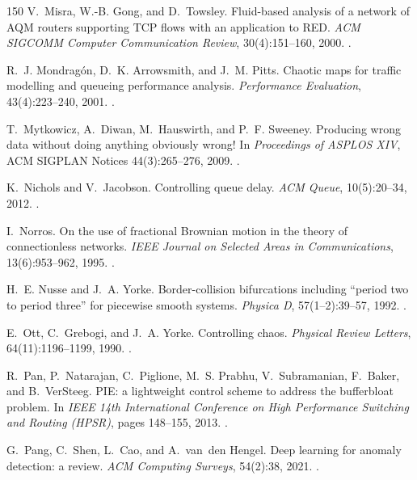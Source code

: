 \begin{thebibliography}{150}
V.~Misra, W.-B. Gong, and D.~Towsley. Fluid-based analysis of a network of AQM routers supporting TCP flows with an application to RED. \emph{ACM SIGCOMM Computer Communication Review}, 30(4):151--160, 2000. .

R.~J. Mondrag{\'o}n, D.~K. Arrowsmith, and J.~M. Pitts. Chaotic maps for traffic modelling and queueing performance analysis. \emph{Performance Evaluation}, 43(4):223--240, 2001. .

T.~Mytkowicz, A.~Diwan, M.~Hauswirth, and P.~F. Sweeney. Producing wrong data without doing anything obviously wrong! In \emph{Proceedings of ASPLOS XIV}, ACM SIGPLAN Notices 44(3):265--276, 2009. .

K.~Nichols and V.~Jacobson. Controlling queue delay. \emph{ACM Queue}, 10(5):20--34, 2012. .

I.~Norros. On the use of fractional Brownian motion in the theory of connectionless networks. \emph{IEEE Journal on Selected Areas in Communications}, 13(6):953--962, 1995. .

H.~E. Nusse and J.~A. Yorke. Border-collision bifurcations including ``period two to period three'' for piecewise smooth systems. \emph{Physica D}, 57(1--2):39--57, 1992. .

E.~Ott, C.~Grebogi, and J.~A. Yorke. Controlling chaos. \emph{Physical Review Letters}, 64(11):1196--1199, 1990. .

R.~Pan, P.~Natarajan, C.~Piglione, M.~S. Prabhu, V.~Subramanian, F.~Baker, and B.~VerSteeg. PIE: a lightweight control scheme to address the bufferbloat problem. In \emph{IEEE 14th International Conference on High Performance Switching and Routing (HPSR)}, pages 148--155, 2013. .

G.~Pang, C.~Shen, L.~Cao, and A.~van~den Hengel. Deep learning for anomaly detection: a review. \emph{ACM Computing Surveys}, 54(2):38, 2021. .


\end{thebibliography}
